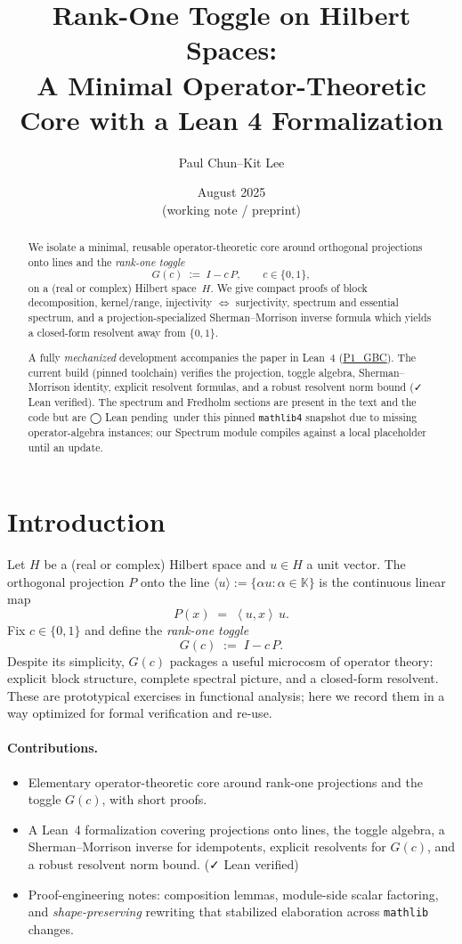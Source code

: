 \documentclass[11pt]{article}
\title{\textbf{Rank-One Toggle on Hilbert Spaces:\\
A Minimal Operator-Theoretic Core with a Lean 4 Formalization}}
\author{Paul Chun--Kit Lee}
\date{August 2025 \\[2pt] \small (working note / preprint)}  %
\theoremstyle{definition}
\newcommand{\K}{\mathbb{K}}
\newcommand{\ip}[2]{\left\langle #1,#2\right\rangle}
\newcommand{\leanRepoTag}{\href{https://github.com/AICardiologist/FoundationRelativity/tree/main/Papers/P1_GBC}{P1\_GBC}}
\newcommand{\leanok}{\textsf{\small \textcolor{green!60!black}{✓ Lean verified}}}
\newcommand{\leanpending}{\textsf{\small \textcolor{orange!80!black}{◯ Lean pending}}}
\begin{document}
\maketitle

\begin{abstract}
We isolate a minimal, reusable operator-theoretic core around orthogonal projections onto lines and the \emph{rank-one toggle}
\[
G(c)\;:=\;I - c\,P,\qquad c\in\{0,1\},
\]
on a (real or complex) Hilbert space~$H$. We give compact proofs of block decomposition, kernel/range, injectivity $\Leftrightarrow$ surjectivity, spectrum and essential spectrum, and a projection-specialized Sherman--Morrison inverse formula which yields a closed-form resolvent away from $\{0,1\}$.

A fully \emph{mechanized} development accompanies the paper in Lean~4 (\leanRepoTag). The current build (pinned toolchain) verifies the projection, toggle algebra, Sherman--Morrison identity, explicit resolvent formulas, and a robust resolvent norm bound (\leanok). The spectrum and Fredholm sections are present in the text and the code but are \leanpending\ under this pinned \texttt{mathlib4} snapshot due to missing operator-algebra instances; our Spectrum module compiles against a local placeholder until an update.  %
\end{abstract}

\tableofcontents

\section{Introduction}

Let $H$ be a (real or complex) Hilbert space and $u\in H$ a unit vector. The orthogonal projection $P$ onto the line $\langle u\rangle:=\{ \alpha u : \alpha\in\K\}$ is the continuous linear map
\[
P(x) \;=\; \ip{u}{x}\,u.
\]
Fix $c\in\{0,1\}$ and define the \emph{rank-one toggle}
\[
G(c) \;:=\; I - c\,P.
\]
Despite its simplicity, $G(c)$ packages a useful microcosm of operator theory: explicit block structure, complete spectral picture, and a closed-form resolvent. These are prototypical exercises in functional analysis; here we record them in a way optimized for formal verification and re-use.

\paragraph{Contributions.}
\begin{itemize}
\item Elementary operator-theoretic core around rank-one projections and the toggle $G(c)$, with short proofs.
\item A Lean~4 formalization covering projections onto lines, the toggle algebra, a Sherman--Morrison inverse for idempotents, explicit resolvents for $G(c)$, and a robust resolvent norm bound. (\leanok)
\item Proof-engineering notes: composition lemmas, module-side scalar factoring, and \emph{shape-preserving} rewriting that stabilized elaboration across \texttt{mathlib} changes.
\end{itemize}
\end{document}
